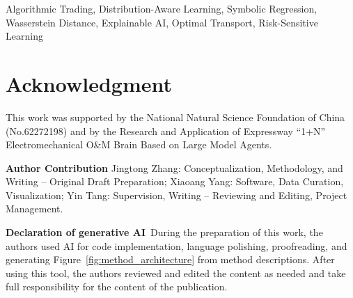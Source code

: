 \documentclass[final,5p]{elsarticle}
\begin{document}
\begin{frontmatter}
\begin{keyword}
Algorithmic Trading, Distribution-Aware Learning, Symbolic Regression, Wasserstein Distance, Explainable AI, Optimal Transport, Risk-Sensitive Learning
\end{keyword}

\end{frontmatter}







\section*{Acknowledgment}
This work was supported by the National Natural Science Foundation of China (No.62272198) and by the Research and Application of Expressway ``1+N'' Electromechanical O\&M Brain Based on Large Model Agents.

\textbf{Author Contribution}
Jingtong Zhang: Conceptualization, Methodology, and Writing -- Original Draft Preparation; 
Xiaoang Yang: Software, Data Curation, Visualization; 
Yin Tang: Supervision, Writing -- Reviewing and Editing, Project Management.

\textbf{Declaration of generative AI}~During the preparation of this work, the authors used AI for code implementation, language polishing, proofreading, and generating Figure~\ref{fig:method_architecture} from method descriptions. After using this tool, the authors reviewed and edited the content as needed and take full responsibility for the content of the publication.




\end{document}
